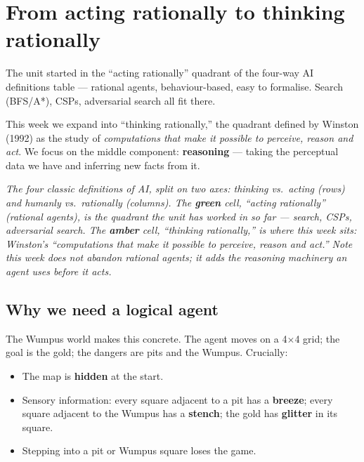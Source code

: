 \documentclass[11pt, a4paper]{article}
\begin{document}
\section{From acting rationally to thinking rationally}

The unit started in the ``acting rationally'' quadrant of the four-way AI definitions table — rational agents, behaviour-based, easy to formalise. Search (BFS/A*), CSPs, adversarial search all fit there.

This week we expand into ``thinking rationally,'' the quadrant defined by Winston (1992) as the study of \emph{computations that make it possible to perceive, reason and act}. We focus on the middle component: \textbf{reasoning} — taking the perceptual data we have and inferring new facts from it.

\begin{center}

\footnotesize\textit{The four classic definitions of AI, split on two axes: thinking vs.\ acting (rows) and humanly vs.\ rationally (columns). The \textbf{green} cell, ``acting rationally'' (rational agents), is the quadrant the unit has worked in so far — search, CSPs, adversarial search. The \textbf{amber} cell, ``thinking rationally,'' is where this week sits: Winston's ``computations that make it possible to perceive, reason and act.'' Note this week does not abandon rational agents; it adds the reasoning machinery an agent uses before it acts.}
\end{center}

\subsection{Why we need a logical agent}

The Wumpus world makes this concrete. The agent moves on a 4$\times$4 grid; the goal is the gold; the dangers are pits and the Wumpus. Crucially:

\begin{itemize}
  \item The map is \textbf{hidden} at the start.
  \item Sensory information: every square adjacent to a pit has a \textbf{breeze}; every square adjacent to the Wumpus has a \textbf{stench}; the gold has \textbf{glitter} in its square.
  \item Stepping into a pit or Wumpus square loses the game.
\end{itemize}
\end{document}
